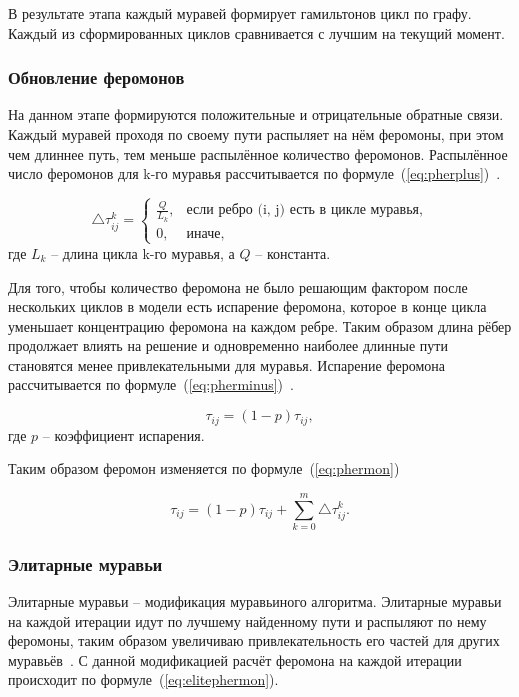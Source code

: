 В результате этапа каждый муравей формирует гамильтонов цикл по графу. Каждый из сформированных  циклов сравнивается с лучшим на текущий момент.

\subsubsection{Обновление феромонов}

На данном этапе формируются положительные и отрицательные обратные связи. Каждый муравей проходя по своему пути распыляет на нём феромоны, при этом чем длиннее путь, тем меньше распылённое количество феромонов. Распылённое число феромонов для k-го муравья рассчитывается по формуле~(\ref{eq:pherplus})~\cite{ieee}.

\begin{equation}
	\label{eq:pherplus}
	\triangle\tau_{ij}^k = \begin{cases}
		\frac{Q}{L_k}, &\text{если ребро (i, j) есть в цикле муравья}, \\
		0, &\text{иначе},
	\end{cases}
\end{equation}
где $L_k$ -- длина цикла k-го муравья, а $Q$ -- константа.

Для того, чтобы количество феромона не было решающим фактором после нескольких циклов в модели есть испарение феромона, которое в конце цикла уменьшает концентрацию феромона на каждом ребре. Таким образом длина рёбер продолжает влиять на решение и одновременно наиболее длинные пути становятся менее привлекательными для муравья. Испарение феромона рассчитывается по формуле~(\ref{eq:pherminus})~\cite{ieee}.

\begin{equation}
	\label{eq:pherminus}
	\tau_{ij} = (1-p)\tau_{ij},
\end{equation}
где $p$ -- коэффициент испарения.

Таким образом феромон изменяется по формуле~(\ref{eq:phermon})

\begin{equation}
	\label{eq:phermon}
	\tau_{ij} = (1-p)\tau_{ij} + \sum_{k=0}^{m}\triangle\tau_{ij}^k.
\end{equation}

\subsubsection{Элитарные муравьи}

Элитарные муравьи -- модификация муравьиного алгоритма. Элитарные муравьи на каждой итерации идут по лучшему найденному пути и распыляют по нему феромоны, таким образом увеличиваю привлекательность его частей для других муравьёв~\cite{ieee}. С данной модификацией расчёт феромона на каждой итерации происходит по формуле~(\ref{eq:elitephermon}).


